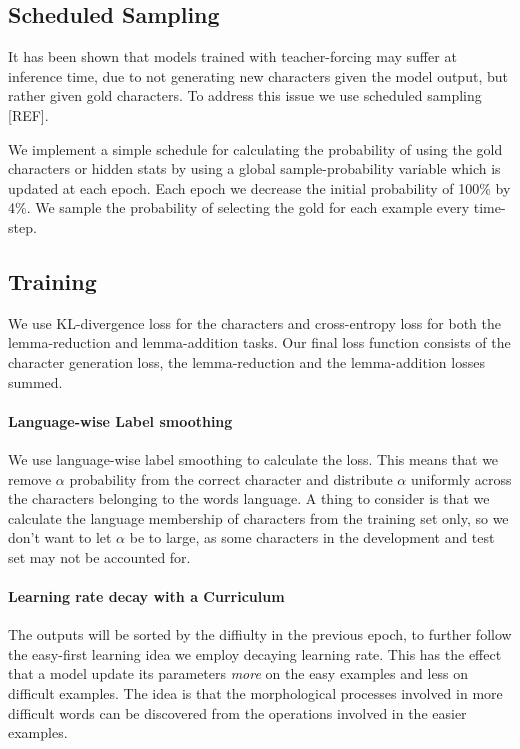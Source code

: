 \documentclass[11pt,a4paper]{article}
\begin{document}
\subsection{Scheduled Sampling}

It has been shown that models trained with teacher-forcing may suffer
at inference time, due to not generating new characters given the
model output, but rather given gold characters. To address this issue
we use scheduled sampling [REF]. 

We implement a simple schedule for calculating the probability of
using the gold characters or hidden stats by using a global
sample-probability variable which is updated at each epoch. Each epoch
we decrease the initial probability of 100\% by 4\%. We sample the
probability of selecting the gold for each example every time-step.

\subsection{Training}

We use KL-divergence loss for the characters and cross-entropy loss
for both the lemma-reduction and lemma-addition tasks. Our final loss
function consists of the character generation loss, the
lemma-reduction and the lemma-addition losses summed.

\paragraph{Language-wise Label smoothing} We use language-wise label
smoothing to calculate the loss. This means that we remove $\alpha$
probability from the correct character and distribute $\alpha$
uniformly across the characters belonging to the words language. A
thing to consider is that we calculate the language membership of
characters from the training set only, so we don't want to let
$\alpha$ be to large, as some characters in the development and test
set may not be accounted for.

\paragraph{Learning rate decay with a Curriculum} The outputs will be
sorted by the diffiulty in the previous epoch, to further follow the
easy-first learning idea we employ decaying learning rate. This has
the effect that a model update its parameters \textit{more} on the
easy examples and less on difficult examples. The idea is that the
morphological processes involved in more difficult words can be
discovered from the operations involved in the easier examples.
\end{document}
